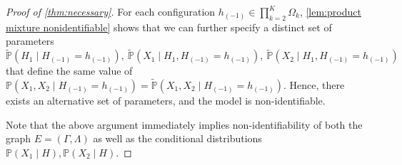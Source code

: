 \documentclass[10pt]{article} %
\newcommand{\PP}{\mathbb P}
\def\tilde{\widetilde}
\begin{document}
\begin{proof}[Proof of \cref{thm:necessary}]
%
%
%
For each configuration $h_{(-1)} \in \prod_{k=2}^K \Omega_k$, \cref{lem:product mixture nonidentifiable} shows that we can further specify a distinct set of parameters 
$$\tilde{\PP}(H_1 \mid H_{(-1)} = h_{(-1)}), ~ \tilde{\PP}(X_1 \mid H_1, H_{(-1)} = h_{(-1)}), ~ \tilde{\PP}(X_2 \mid H_1, H_{(-1)} = h_{(-1)})$$ that define the same value of 
$\PP(X_1, X_2 \mid H_{(-1)} = h_{(-1)}) = \tilde{\PP}(X_1, X_2 \mid H_{(-1)} = h_{(-1)})$. Hence, there exists an alternative set of parameters, and the model is non-identifiable. %

Note that the above argument immediately implies non-identifiability of both the graph $E = (\Gamma, \Lambda)$ as well as the conditional distributions $\PP(X_1 \mid H), \PP(X_2 \mid H)$.
%
\end{proof}
\end{document}
